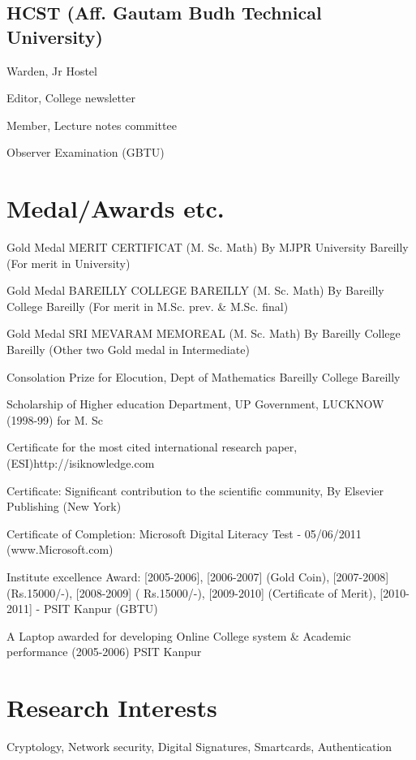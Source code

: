 \documentclass[letterpaper]{article}
\renewenvironment{itemize}{
  \begin{list}{}{
    \setlength{\leftmargin}{1.5em}
  }
}{
  \end{list}
}
\begin{document}
\subsection*{HCST (Aff. Gautam Budh Technical University)}
\begin{itemize}
\item Warden, Jr Hostel
\item Editor, College newsletter
\item Member, Lecture notes committee
\item Observer Examination (GBTU)
\end{itemize}

\section*{Medal/Awards etc.}
  \begin{itemize}
\item Gold Medal MERIT CERTIFICAT (M. Sc. Math)  By MJPR University Bareilly (For merit in University)
\item Gold Medal BAREILLY COLLEGE BAREILLY (M. Sc. Math) By Bareilly College Bareilly (For merit in M.Sc. prev. \& M.Sc. final)
\item Gold Medal SRI MEVARAM MEMOREAL   (M. Sc. Math)      By Bareilly College Bareilly (Other two Gold medal in Intermediate)
\item Consolation Prize for Elocution, Dept of Mathematics     Bareilly College Bareilly
\item Scholarship of Higher education Department, UP Government, LUCKNOW (1998-99) for M. Sc
\item Certificate for the most cited international research paper, (ESI)http://isiknowledge.com
\item Certificate: Significant contribution to the scientific community, By Elsevier Publishing   (New York) 
\item Certificate of Completion: Microsoft Digital Literacy Test - 05/06/2011    (www.Microsoft.com)

\item Institute excellence Award: [2005-2006], [2006-2007] (Gold Coin), [2007-2008] (Rs.15000/-), [2008-2009] ( Rs.15000/-), [2009-2010] (Certificate of Merit), [2010-2011] - PSIT Kanpur (GBTU)
\item A Laptop awarded for developing Online College system \& Academic performance (2005-2006) 
      PSIT Kanpur
\end{itemize}

\section*{Research Interests}
Cryptology, Network security, Digital Signatures, Smartcards, Authentication
\end{document}
